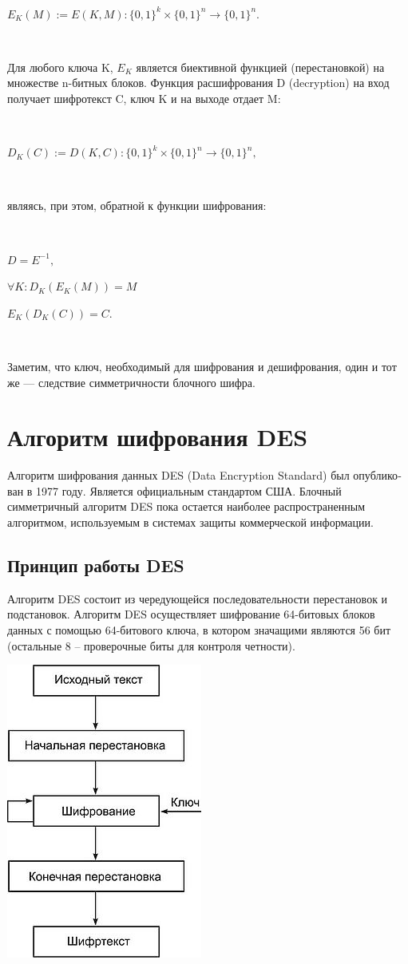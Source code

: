 \documentclass[a4paper]{report}
\begin{document}
~

$E_K(M) := E(K,M) : \{0,1\}^k \times \{0,1\}^n \to \{0,1\}^n.$

~

Для любого ключа K, $E_K$ является биективной функцией (перестановкой) на множестве n-битных блоков. Функция расшифрования D (decryption) на вход получает шифротекст C, ключ K и на выходе отдает M:

~

$D_K(C) := D(K,C) : \{0,1\}^k \times \{0,1\}^n \to \{0,1\}^n,$

~

являясь, при этом, обратной к функции шифрования:

~

$D = E^{-1},$
\medskip

$\forall K: D_K(E_K(M)) = M$
\medskip

$E_K(D_K(C)) = C.$

~

Заметим, что ключ, необходимый для шифрования и дешифрования, один и тот же — следствие симметричности блочного шифра.

\section{Алгоритм шифрования DES}
Алгоритм шифрования данных DES (Data Encryption Standard) был опублико­ван в 1977 году. Является официальным стандартом США. Блочный симметричный алгоритм DES пока остается наиболее распространенным алгоритмом, используемым в системах защиты коммерческой информации.

\subsection{Принцип работы DES}

Алгоритм DES состоит из чередующейся последовательности перестановок и подстановок. Алгоритм DES осуществляет шифрование 64-битовых блоков данных с помощью 64-битового ключа, в котором значащими являются 56 бит (остальные 8 – проверочные биты для контроля четности).


\includegraphics[scale=1.4]{DES}
{\\}
\end{document}
